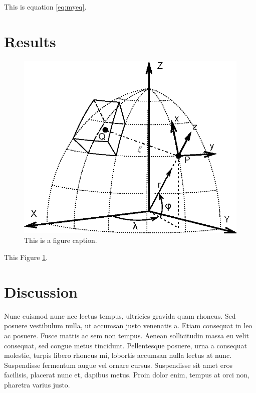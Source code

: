 This is equation \ref{eq:myeq}.

\section{Results}

\begin{figure}
    \centering
    \includegraphics[width=\columnwidth]{figs/figure}
    \caption{This is a figure caption.}
    \label{fig:myfig}
\end{figure}

This Figure \ref{fig:myfig}.


\section{Discussion}

Nunc euismod nunc nec lectus tempus, ultricies gravida quam rhoncus. Sed
posuere vestibulum nulla, ut accumsan justo venenatis a. Etiam consequat in leo
ac posuere. Fusce mattis ac sem non tempus. Aenean sollicitudin massa eu velit
consequat, sed congue metus tincidunt. Pellentesque posuere, urna a consequat
molestie, turpis libero rhoncus mi, lobortis accumsan nulla lectus at nunc.
Suspendisse fermentum augue vel ornare cursus. Suspendisse sit amet eros
facilisis, placerat nunc et, dapibus metus. Proin dolor enim, tempus at orci
non, pharetra varius justo.

